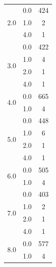 \begin{longtable}{|c|c|c|c|c|}
\hline
\multirow{3}{*}{2.0} & \multicolumn{2}{c|}{0.0} & \multicolumn{2}{c|}{424} \\
& \multicolumn{2}{c|}{1.0} & \multicolumn{2}{c|}{2} \\
& \multicolumn{2}{c|}{4.0} & \multicolumn{2}{c|}{1} \\
\hline
\multirow{4}{*}{3.0} & \multicolumn{2}{c|}{0.0} & \multicolumn{2}{c|}{422} \\
& \multicolumn{2}{c|}{1.0} & \multicolumn{2}{c|}{4} \\
& \multicolumn{2}{c|}{2.0} & \multicolumn{2}{c|}{1} \\
& \multicolumn{2}{c|}{4.0} & \multicolumn{2}{c|}{1} \\
\hline
\multirow{2}{*}{4.0} & \multicolumn{2}{c|}{0.0} & \multicolumn{2}{c|}{665} \\
& \multicolumn{2}{c|}{1.0} & \multicolumn{2}{c|}{4} \\
\hline
\multirow{4}{*}{5.0} & \multicolumn{2}{c|}{0.0} & \multicolumn{2}{c|}{448} \\
& \multicolumn{2}{c|}{1.0} & \multicolumn{2}{c|}{6} \\
& \multicolumn{2}{c|}{2.0} & \multicolumn{2}{c|}{1} \\
& \multicolumn{2}{c|}{4.0} & \multicolumn{2}{c|}{1} \\
\hline
\multirow{2}{*}{6.0} & \multicolumn{2}{c|}{0.0} & \multicolumn{2}{c|}{505} \\
& \multicolumn{2}{c|}{1.0} & \multicolumn{2}{c|}{4} \\
\hline
\multirow{4}{*}{7.0} & \multicolumn{2}{c|}{0.0} & \multicolumn{2}{c|}{403} \\
& \multicolumn{2}{c|}{1.0} & \multicolumn{2}{c|}{2} \\
& \multicolumn{2}{c|}{2.0} & \multicolumn{2}{c|}{1} \\
& \multicolumn{2}{c|}{4.0} & \multicolumn{2}{c|}{1} \\
\hline
\multirow{2}{*}{8.0} & \multicolumn{2}{c|}{0.0} & \multicolumn{2}{c|}{577} \\
& \multicolumn{2}{c|}{1.0} & \multicolumn{2}{c|}{4} \\
\hline

\end{longtable}
